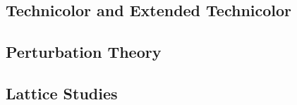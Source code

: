 
\subsection{Technicolor and Extended Technicolor}

\subsection{Perturbation Theory}

\subsection{Lattice Studies}
